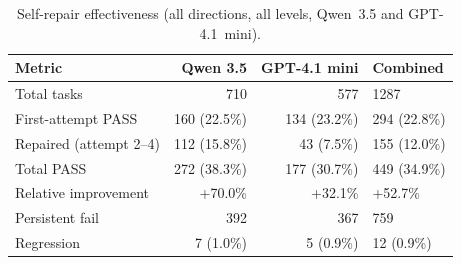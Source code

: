 \begin{table}[htbp]
\centering
\caption{Self-repair effectiveness (all directions, all levels, Qwen~3.5 and GPT-4.1~mini).}
\label{tab:self-repair}
\small
\begin{tabular}{@{}lrrl@{}}
\toprule
Metric & Qwen 3.5 & GPT-4.1 mini & Combined \\
\midrule
Total tasks & 710 & 577 & 1287 \\ %
First-attempt PASS & 160 (22.5\%) & 134 (23.2\%) & 294 (22.8\%) \\ %
Repaired (attempt 2--4) & 112 (15.8\%) & 43 (7.5\%) & 155 (12.0\%) \\ %
Total PASS & 272 (38.3\%) & 177 (30.7\%) & 449 (34.9\%) \\ %
Relative improvement & +70.0\% & +32.1\% & +52.7\% \\ %
Persistent fail & 392 & 367 & 759 \\ %
Regression & 7 (1.0\%) & 5 (0.9\%) & 12 (0.9\%) \\ %
\bottomrule
\end{tabular}
\end{table}


